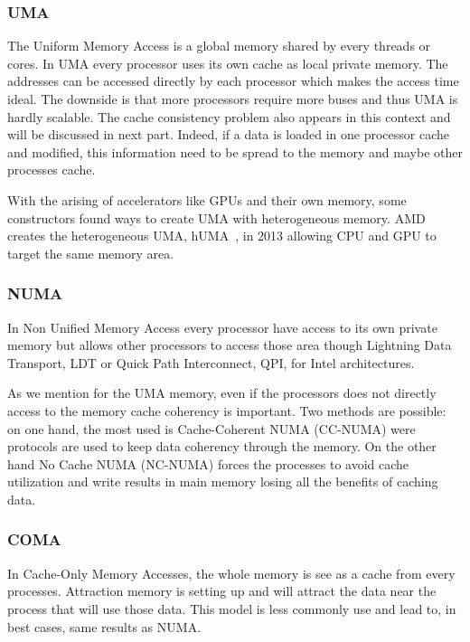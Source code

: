 \subsubsection{UMA}
The Uniform Memory Access is a global memory shared by every threads or cores. 
In UMA every processor uses its own cache as local private memory. 
The addresses can be accessed directly by each processor which makes the access time ideal. 
The downside is that more processors require more buses and thus UMA is hardly scalable. 
The cache consistency problem also appears in this context and will be discussed in next part. 
Indeed, if a data is loaded in one processor cache and modified, this information need to be spread to the memory and maybe other processes cache. 

With the arising of accelerators like GPUs and their own memory, some constructors found ways to create UMA with heterogeneous memory. 
AMD creates the heterogeneous UMA, hUMA~\cite{rogers2013amd}, in 2013 allowing CPU and GPU to target the same memory area.

\subsubsection{NUMA}
In Non Unified Memory Access every processor have access to its own private memory but allows other processors to access those area though Lightning Data Transport, LDT or Quick Path Interconnect, QPI, for Intel architectures. 

As we mention for the UMA memory, even if the processors does not directly access to the memory cache coherency is important. 
Two methods are possible: on one hand, the most used is Cache-Coherent NUMA (CC-NUMA) were protocols are used to keep data coherency through the memory. On the other hand No Cache NUMA (NC-NUMA) forces the processes to avoid cache utilization and write results in main memory losing all the benefits of caching data. 

\subsubsection{COMA}
In Cache-Only Memory Accesses, the whole memory is see as a cache from every processes.
Attraction memory is setting up and will attract the data near the process that will use those data. 
This model is less commonly use and lead to, in best cases, same results as NUMA.

